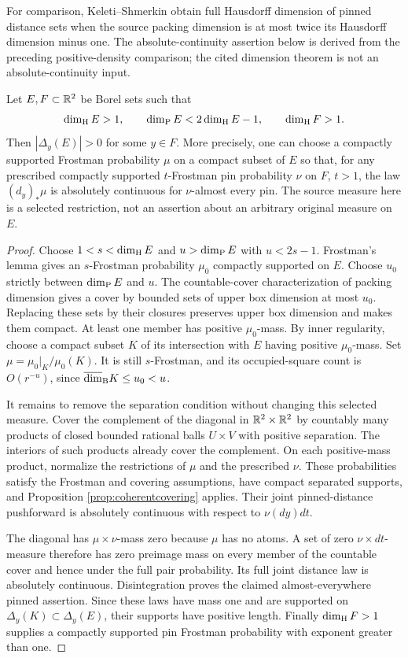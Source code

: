 For comparison, Keleti--Shmerkin \cite[Theorem 1.2]{ks} obtain full Hausdorff dimension of pinned distance sets when the source packing dimension is at most twice its Hausdorff dimension minus one. The absolute-continuity assertion below is derived from the preceding positive-density comparison; the cited dimension theorem is not an absolute-continuity input.

\begin{proposition}\label{prop:coherentborel}
Let \(E,F\subset\mathbb R^2\) be Borel sets such that
$$
\dim_{\mathrm H} E>1,\qquad \dim_{\mathrm P} E<2\dim_{\mathrm H} E-1,\qquad \dim_{\mathrm H} F>1.
$$
Then \(|\Delta_y(E)|>0\) for some \(y\in F\). More precisely, one can choose a compactly supported Frostman probability \(\mu\) on a compact subset of \(E\) so that, for any prescribed compactly supported \(t\)-Frostman pin probability \(\nu\) on \(F\), \(t>1\), the law \((d_y)_*\mu\) is absolutely continuous for \(\nu\)-almost every pin. The source measure here is a selected restriction, not an assertion about an arbitrary original measure on \(E\).
\end{proposition}
\begin{proof}
Choose \(1<s<\dim_{\mathrm H} E\) and \(u>\dim_{\mathrm P} E\) with \(u<2s-1\). Frostman's lemma gives an \(s\)-Frostman probability \(\mu_0\) compactly supported on \(E\). Choose \(u_0\) strictly between \(\dim_{\mathrm P} E\) and \(u\). The countable-cover characterization of packing dimension gives a cover by bounded sets of upper box dimension at most \(u_0\). Replacing these sets by their closures preserves upper box dimension and makes them compact. At least one member has positive \(\mu_0\)-mass. By inner regularity, choose a compact subset \(K\) of its intersection with \(E\) having positive \(\mu_0\)-mass. Set \(\mu=\mu_0|_K/\mu_0(K)\). It is still \(s\)-Frostman, and its occupied-square count is \(O(r^{-u})\), since \(\overline{\dim}_{\rm B}K\leq u_0<u\).

It remains to remove the separation condition without changing this selected measure. Cover the complement of the diagonal in \(\mathbb R^2\times\mathbb R^2\) by countably many products of closed bounded rational balls \(U\times V\) with positive separation. The interiors of such products already cover the complement. On each positive-mass product, normalize the restrictions of \(\mu\) and the prescribed \(\nu\). These probabilities satisfy the Frostman and covering assumptions, have compact separated supports, and Proposition \ref{prop:coherentcovering} applies. Their joint pinned-distance pushforward is absolutely continuous with respect to \(\nu(dy)dt\).

The diagonal has \(\mu\times\nu\)-mass zero because \(\mu\) has no atoms. A set of zero \(\nu\times dt\)-measure therefore has zero preimage mass on every member of the countable cover and hence under the full pair probability. Its full joint distance law is absolutely continuous. Disintegration proves the claimed almost-everywhere pinned assertion. Since these laws have mass one and are supported on \(\Delta_y(K)\subset\Delta_y(E)\), their supports have positive length. Finally \(\dim_{\mathrm H} F>1\) supplies a compactly supported pin Frostman probability with exponent greater than one.
\end{proof}
